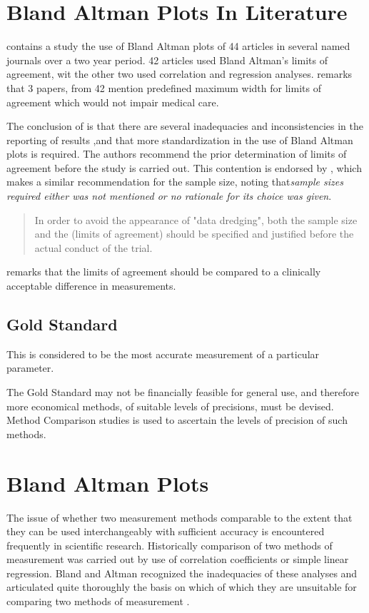 \documentclass[12pt, a4paper]{report}
\theoremstyle{plain}
\theoremstyle{definition}
\theoremstyle{remark}
\begin{document}
	\section{Bland Altman Plots In Literature}
	\citet{mantha} contains a study the use of Bland Altman plots of
	44 articles in several named journals over a two year period. 42
	articles used Bland Altman's limits of agreement, wit the other
	two used correlation and regression analyses. \citet{mantha}
	remarks that 3 papers, from 42 mention predefined maximum width
	for limits of agreement which would not impair medical care.
	
	The conclusion of \citet{mantha} is that there are several
	inadequacies and inconsistencies in the reporting of results ,and
	that more standardization in the use of Bland Altman plots is
	required. The authors recommend the prior determination of limits
	of agreement before the study is carried out. This contention is
	endorsed by \citet{lin}, which makes a similar recommendation for
	the sample size, noting that\emph{sample sizes required either was
		not mentioned or no rationale for its choice was given}.
	
	\begin{quote}
		In order to avoid the appearance of "data dredging", both the
		sample size and the (limits of agreement) should be specified and
		justified before the actual conduct of the trial. \citep{lin}
	\end{quote}
	
	\citet{Dewitte} remarks that the limits of agreement should be
	compared to a clinically acceptable difference in measurements.
	
	
	\subsection{Gold Standard} This is considered to be the most
	accurate measurement of a particular parameter.
	
		The Gold Standard may not be financially feasible for general use, and therefore more economical methods, of suitable levels of precisions, must be devised. Method Comparison studies is used to ascertain the levels of precision of such methods.
		\smallskip
		
	
	\section{Bland Altman Plots}
	The issue of whether two measurement methods comparable to the
	extent that they can be used interchangeably with sufficient
	accuracy is encountered frequently in scientific research.
	Historically comparison of two methods of measurement was carried
	out by use of correlation coefficients or simple linear
	regression. Bland and Altman recognized the inadequacies of these
	analyses and articulated quite thoroughly the basis on which of
	which they are unsuitable for comparing two methods of measurement
	\citep*{BA83}.
	
\end{document}
